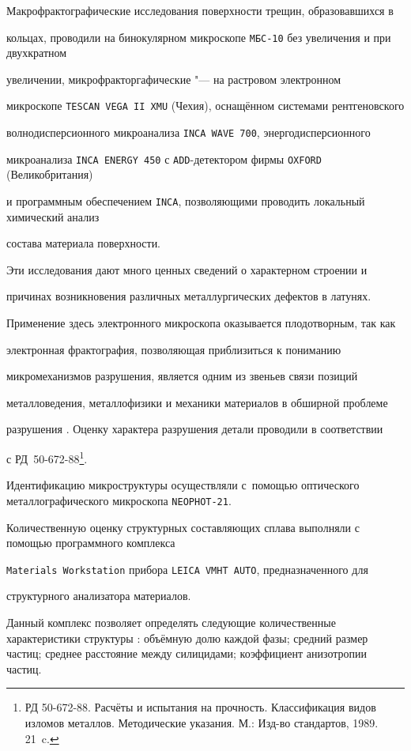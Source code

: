 Макрофрактографические исследования поверхности трещин, образовавшихся в

кольцах, проводили на бинокулярном микроскопе {\tt МБС-10} без увеличения и при двухкратном

увеличении, микрофракторгафические "--- на растровом электронном

микроскопе {\tt TESCAN\,VEGA\,II\,XMU} (Чехия), оснащённом системами рентгеновского

волнодисперсионного микроанализа {\tt INCA\,WAVE\,700}, энергодисперсионного

микроанализа {\tt INCA\,ENERGY\,450} с {\tt ADD}-детектором фирмы {\tt OXFORD} (Великобритания)

и программным обеспечением {\tt INCA}, позволяющими проводить локальный химический анализ

состава материала поверхности.





Эти исследования дают много ценных сведений о характерном строении и

причинах возникновения различных металлургических дефектов в латунях.

Применение здесь электронного микроскопа оказывается плодотворным, так как

электронная фрактография, позволяющая приблизиться к пониманию

микромеханизмов разрушения, является одним из звеньев связи позиций

металловедения, металлофизики и механики материалов в обширной проблеме

разрушения \cite{pugacheva:bib4}. Оценку характера разрушения детали проводили в соответствии

с РД~50-672-88\footnote{РД 50-672-88. Расчёты и испытания на прочность. Классификация видов изломов металлов. Методические указания. М.: Изд-во стандартов, 1989. 21~c.}\!.



Идентификацию микроструктуры осуществляли с~помощью оптического металлографического микроскопа {\tt NEOPHOT-21}. 

Количественную оценку структурных составляющих сплава выполняли с помощью программного комплекса 

{\tt Mаterials Workstation} прибора {\tt LEICA VMHT AUTO}, предназначенного для

структурного анализатора материалов. 

Данный комплекс позволяет определять следующие количественные характеристики структуры \cite{pugacheva:bib3}: объёмную долю каждой фазы; средний размер частиц; среднее расстояние между силицидами; коэффициент анизотропии частиц.



